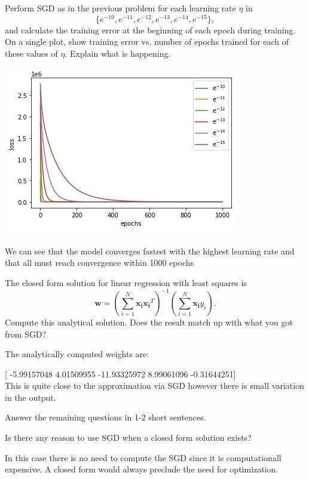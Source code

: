 \begin{problem}[2]
  Perform SGD as in the previous problem for each learning rate $\eta$ in \[\{e^{-10}, e^{-11}, e^{-12}, e^{-13}, e^{-14}, e^{-15}\},\] and calculate the training error at the beginning of each epoch during training.  On a single plot, show training error vs. number of epochs trained for each of these values of $\eta$. Explain what is happening.
\end{problem}
\begin{solution}
  \includegraphics{set1/images/Unknown-11.png}\\
  \\
  We can see that the model converges fastest with the highest learning rate and that all must reach convergence within 1000 epochs
\end{solution}


\begin{problem}[2]
  The closed form solution for linear regression with least squares is \[\mathbf{w} = \left(\sum_{i=1}^N \mathbf{x_i}\mathbf{x_i}^T\right)^{-1}\left(\sum_{i=1}^N \mathbf{x_i}y_i\right).\]  Compute this analytical solution.  Does the result match up with what you got from SGD?
\end{problem}
\begin{solution}
   The analytically computed weights are:
  
  [ -5.99157048   4.01509955 -11.93325972   8.99061096  -0.31644251]
  \\
  This is quite close to the approximation via SGD however there is small variation in the output.
\end{solution}

Answer the remaining questions in 1-2 short sentences.

\begin{problem}[2]
  Is there any reason to use SGD when a closed form solution exists?
\end{problem}
\begin{solution}
In this case there is no need to compute the SGD since it is computationall expensive. A closed form would always preclude the need for optimization.
\end{solution}

